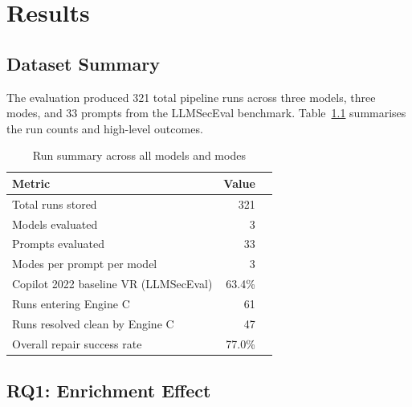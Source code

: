 \documentclass[12pt,a4paper]{report}
\begin{document}
\setcounter{page}{21}
\setcounter{chapter}{4}   %

\chapter{Results}
\label{ch:results}

\section{Dataset Summary}
\label{sec:datasummary}

The evaluation produced 321 total pipeline runs across three models, three modes,
and 33 prompts from the LLMSecEval benchmark. Table~\ref{tab:runsummary}
summarises the run counts and high-level outcomes.

\begin{table}[H]
\centering
\caption{Run summary across all models and modes}
\label{tab:runsummary}
\renewcommand{\arraystretch}{1.3}
\begin{tabular}{@{}lrr@{}}
\toprule
\textbf{Metric}                          & \textbf{Value} \\
\midrule
Total runs stored                        & 321           \\
Models evaluated                         & 3             \\
Prompts evaluated                        & 33            \\
Modes per prompt per model               & 3             \\
Copilot 2022 baseline VR (LLMSecEval)   & 63.4\%        \\
Runs entering Engine C                   & 61            \\
Runs resolved clean by Engine C          & 47            \\
Overall repair success rate              & 77.0\%        \\
\bottomrule
\end{tabular}
\end{table}

\section{RQ1: Enrichment Effect}
\label{sec:rq1}
\end{document}
